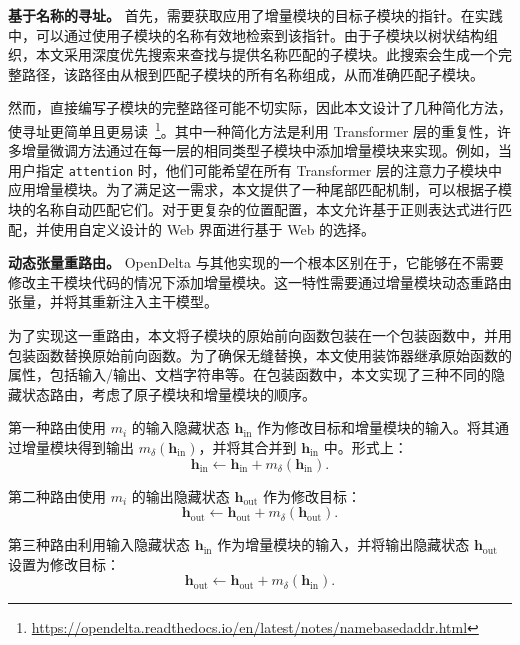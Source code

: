 \textbf{基于名称的寻址。} 首先，需要获取应用了增量模块的目标子模块的指针。在实践中，可以通过使用子模块的名称有效地检索到该指针。由于子模块以树状结构组织，本文采用深度优先搜索来查找与提供名称匹配的子模块。此搜索会生成一个完整路径，该路径由从根到匹配子模块的所有名称组成，从而准确匹配子模块。

然而，直接编写子模块的完整路径可能不切实际，因此本文设计了几种简化方法，使寻址更简单且更易读~\footnote{\url{https://opendelta.readthedocs.io/en/latest/notes/namebasedaddr.html}}。其中一种简化方法是利用 Transformer 层的重复性，许多增量微调方法通过在每一层的相同类型子模块中添加增量模块来实现。例如，当用户指定 \texttt{attention} 时，他们可能希望在所有 Transformer 层的注意力子模块中应用增量模块。为了满足这一需求，本文提供了一种尾部匹配机制，可以根据子模块的名称自动匹配它们。对于更复杂的位置配置，本文允许基于正则表达式进行匹配，并使用自定义设计的 Web 界面进行基于 Web 的选择。

\textbf{动态张量重路由。} OpenDelta 与其他实现的一个根本区别在于，它能够在不需要修改主干模块代码的情况下添加增量模块。这一特性需要通过增量模块动态重路由张量，并将其重新注入主干模型。

为了实现这一重路由，本文将子模块的原始前向函数包装在一个包装函数中，并用包装函数替换原始前向函数。为了确保无缝替换，本文使用装饰器继承原始函数的属性，包括输入/输出、文档字符串等。在包装函数中，本文实现了三种不同的隐藏状态路由，考虑了原子模块和增量模块的顺序。

第一种路由使用 $m_i$ 的输入隐藏状态 $\mathbf{h}_\text{in}$ 作为修改目标和增量模块的输入。将其通过增量模块得到输出 $m_\delta(\mathbf{h}_\text{in})$，并将其合并到 $\mathbf{h}_\text{in}$ 中。形式上：
\begin{equation}
\label{equ:in}
\mathbf{h}_\text{in}\leftarrow\mathbf{h}_\text{in} + m_\delta(\mathbf{h}_\text{in}).
\end{equation}

第二种路由使用 $m_i$ 的输出隐藏状态 $\mathbf{h}_\text{out}$ 作为修改目标：
\begin{equation}
\label{equ:after}
\mathbf{h}_\text{out}\leftarrow\mathbf{h}_\text{out} + m_\delta(\mathbf{h}_\text{out}).
\end{equation}

第三种路由利用输入隐藏状态 $\mathbf{h}_\text{in}$ 作为增量模块的输入，并将输出隐藏状态 $\mathbf{h}_\text{out}$ 设置为修改目标：
\begin{equation}
\label{equ:para}
\mathbf{h}_{\text{out}}\leftarrow\mathbf{h}_\text{out} + m_\delta(\mathbf{h}_\text{in}).
\end{equation}


